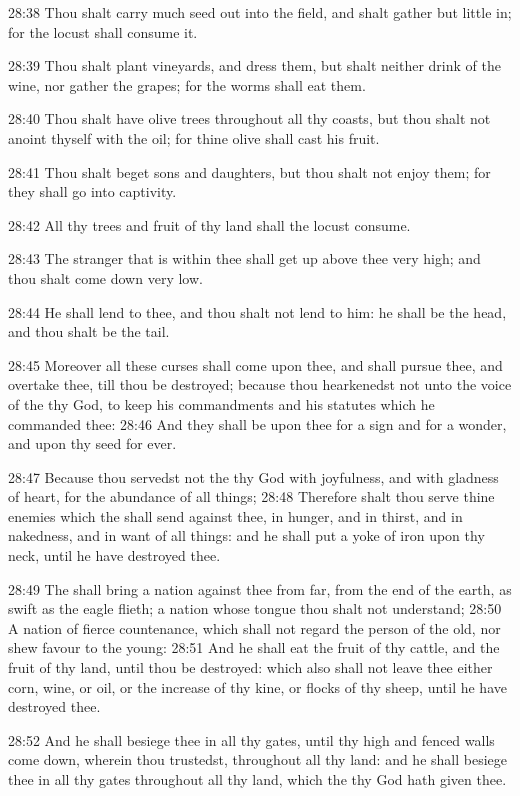 28:38 Thou shalt carry much seed out into the field, and shalt gather
but little in; for the locust shall consume it.

28:39 Thou shalt plant vineyards, and dress them, but shalt neither
drink of the wine, nor gather the grapes; for the worms shall eat
them.

28:40 Thou shalt have olive trees throughout all thy coasts, but thou
shalt not anoint thyself with the oil; for thine olive shall cast his
fruit.

28:41 Thou shalt beget sons and daughters, but thou shalt not enjoy
them; for they shall go into captivity.

28:42 All thy trees and fruit of thy land shall the locust consume.

28:43 The stranger that is within thee shall get up above thee very
high; and thou shalt come down very low.

28:44 He shall lend to thee, and thou shalt not lend to him: he shall
be the head, and thou shalt be the tail.

28:45 Moreover all these curses shall come upon thee, and shall pursue
thee, and overtake thee, till thou be destroyed; because thou
hearkenedst not unto the voice of the \LORD thy God, to keep his
commandments and his statutes which he commanded thee: 28:46 And they
shall be upon thee for a sign and for a wonder, and upon thy seed for
ever.

28:47 Because thou servedst not the \LORD thy God with joyfulness, and
with gladness of heart, for the abundance of all things; 28:48
Therefore shalt thou serve thine enemies which the \LORD shall send
against thee, in hunger, and in thirst, and in nakedness, and in want
of all things: and he shall put a yoke of iron upon thy neck, until he
have destroyed thee.

28:49 The \LORD shall bring a nation against thee from far, from the
end of the earth, as swift as the eagle flieth; a nation whose tongue
thou shalt not understand; 28:50 A nation of fierce countenance, which
shall not regard the person of the old, nor shew favour to the young:
28:51 And he shall eat the fruit of thy cattle, and the fruit of thy
land, until thou be destroyed: which also shall not leave thee either
corn, wine, or oil, or the increase of thy kine, or flocks of thy
sheep, until he have destroyed thee.

28:52 And he shall besiege thee in all thy gates, until thy high and
fenced walls come down, wherein thou trustedst, throughout all thy
land: and he shall besiege thee in all thy gates throughout all thy
land, which the \LORD thy God hath given thee.

